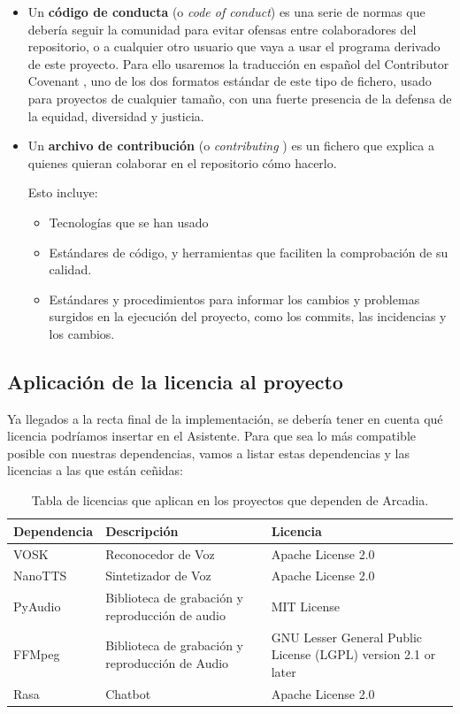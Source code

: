 \begin{itemize}
	\item Un \textbf{código de conducta} (o \textit{code of conduct}) es una serie de normas que debería seguir la comunidad para evitar ofensas entre colaboradores del repositorio, o a cualquier otro usuario que vaya a usar el programa derivado de este proyecto.
	Para ello usaremos la traducción en español del Contributor Covenant \cite{contributor-covenant}, uno de los dos formatos estándar de este tipo de fichero, usado para proyectos de cualquier tamaño, con una fuerte presencia de la defensa de la equidad, diversidad y justicia.
	\item Un \textbf{archivo de contribución} (o \textit{contributing} \cite{contributing}) es un fichero que explica a quienes quieran colaborar en el repositorio cómo hacerlo.
	
	Esto incluye:
	\begin{itemize}
		\item Tecnologías que se han usado
		\item Estándares de código, y herramientas que faciliten la comprobación de su calidad.
		\item Estándares y procedimientos para informar los cambios y problemas surgidos en la ejecución del proyecto, como los commits, las incidencias y los cambios.
	\end{itemize}
\end{itemize}

\subsection{Aplicación de la licencia al proyecto}
Ya llegados a la recta final de la implementación, se debería tener en cuenta qué licencia podríamos insertar en el Asistente. Para que sea lo más compatible posible con nuestras dependencias, vamos a listar estas dependencias y las licencias a las que están ceñidas:

\begin{center}
	\begin{table}[H]
		\centering
		\begin{tabularx}{\textwidth}{|l|X|X|}
			\hline
			{\cellcolor{lightblue}}\textbf{Dependencia} & {\cellcolor{lightblue}}\textbf{Descripción} & {\cellcolor{lightblue}}\textbf{Licencia} \\
			\hline
			VOSK & Reconocedor de Voz & Apache License 2.0 \\ \hline
			NanoTTS & Sintetizador de Voz & Apache License 2.0  \\ \hline
			PyAudio & Biblioteca de grabación y reproducción de audio & MIT License \\ \hline
			FFMpeg & Biblioteca de grabación y reproducción de Audio & GNU Lesser General Public License (LGPL) version 2.1 or later \\  \hline
			Rasa & Chatbot & Apache License 2.0 \\ \hline
		\end{tabularx}
		\caption{Tabla de licencias que aplican en los proyectos que dependen de Arcadia.}
	\end{table}
\end{center}

